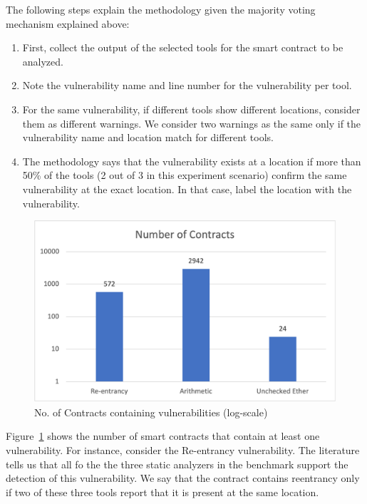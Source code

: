 	The following steps explain the methodology given the majority voting mechanism explained above:
	
	\begin{enumerate}
	
	\item First, collect the output of the selected tools for the smart contract to be analyzed.
	
	\item Note the vulnerability name and line number for the vulnerability per tool. 
	
	\item For the same vulnerability, if different tools show different locations, consider them as different warnings. We consider two warnings as the same only if the vulnerability name and location match for different tools.
	
	\item The methodology says that the vulnerability exists at a location if more than 50\% of the tools (2 out of 3 in this experiment scenario) confirm the same vulnerability at the exact location. In that case, label the location with the vulnerability.
	
	\end{enumerate}
	
	\begin{figure}[t]
		\centering
		\includegraphics[width=1\textwidth]{figures/Picture1.png}
		\caption{No. of Contracts containing vulnerabilities (log-scale)}
		\label{fig:chart_vuln_count}
	\end{figure}
		
		Figure~\ref{fig:chart_vuln_count} shows the number of smart contracts that contain at least one vulnerability.
		For instance, consider the Re-entrancy vulnerability.
		The literature tells us that all fo the the three static analyzers in the benchmark support the detection of this vulnerability.
		We say that the contract contains reentrancy only if two of these three tools report that it is present at the same location.


